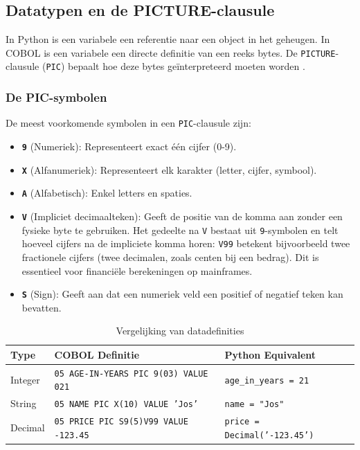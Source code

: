 \subsection{Datatypen en de PICTURE-clausule}
In Python is een variabele een referentie naar een object in het geheugen. 
In COBOL is een variabele een directe definitie van een reeks bytes. 
De \texttt{PICTURE}-clausule (\texttt{PIC}) bepaalt hoe deze bytes geïnterpreteerd moeten worden \autocite{IBM2023}.

\subsubsection{De PIC-symbolen}

De meest voorkomende symbolen in een \texttt{PIC}-clausule zijn:
\begin{itemize}
    \item \textbf{\texttt{9}} (Numeriek): Representeert exact één cijfer (0-9).
    \item \textbf{\texttt{X}} (Alfanumeriek): Representeert elk karakter (letter, cijfer, symbool).
    \item \textbf{\texttt{A}} (Alfabetisch): Enkel letters en spaties.
    \item \textbf{\texttt{V}} (Impliciet decimaalteken): Geeft de positie van de komma aan zonder een fysieke byte te gebruiken. Het gedeelte na \texttt{V} bestaat uit \texttt{9}-symbolen en telt hoeveel cijfers na de impliciete komma horen: \texttt{V99} betekent bijvoorbeeld twee fractionele cijfers (twee decimalen, zoals centen bij een bedrag). Dit is essentieel voor financiële berekeningen op mainframes.
    \item \textbf{\texttt{S}} (Sign): Geeft aan dat een numeriek veld een positief of negatief teken kan bevatten.
\end{itemize}

\begin{table}[h!]
    \centering
    \caption{Vergelijking van datadefinities}
    \label{tab:pic-vergelijking}
    \begin{tabular}{|l|l|l|}
        \hline
        \textbf{Type} & \textbf{COBOL Definitie} & \textbf{Python Equivalent} \\ \hline
        Integer & \texttt{05 AGE-IN-YEARS PIC 9(03) VALUE 021} & \texttt{age\_in\_years = 21} \\ \hline
        String & \texttt{05 NAME PIC X(10) VALUE 'Jos'} & \texttt{name = "Jos"} \\ \hline
        Decimal & \texttt{05 PRICE PIC S9(5)V99 VALUE -123.45} & \texttt{price = Decimal('-123.45')} \\ \hline
    \end{tabular}
\end{table}


